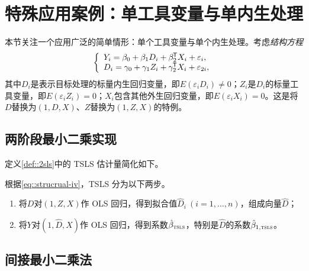 \section{特殊应用案例：单工具变量与单内生处理}


本节关注一个应用广泛的简单情形：单个工具变量与单个内生处理。考虑{\it 结构方程}
\begin{eqnarray}
\label{eq::strucrual-iv}
\left\{
\begin{array}{l}
Y_i = \beta_0 + \beta_1 D_i + \beta_2^{\mkern-1.5mu\mathsf{T}} X_i + \varepsilon_{i},\\
D_i = \gamma_0 + \gamma_1 Z_i + \gamma_2 ^{\mkern-1.5mu\mathsf{T}} X_i + \varepsilon_{2i},
\end{array}
\right.
\end{eqnarray}
其中$D_i$是表示目标处理的标量内生回归变量，即$E(\varepsilon_{i} D_i) \neq 0$；$Z_i$是$D_i$的标量工具变量，即$E(\varepsilon_{i} Z_i) = 0$；$X_i$包含其他外生回归变量，即$E(\varepsilon_{i} X_i) = 0$。这是将$D$替换为$(1, D, X)$、$Z$替换为$(1, Z, X)$的特例。 



\subsection{两阶段最小二乘实现}

定义\ref{def::2sls}中的 TSLS 估计量简化如下。 

\begin{definition}
\label{def::tsls-single}
根据\eqref{eq::strucrual-iv}，TSLS 分为以下两步。
\begin{enumerate}
\item
将$D$对$(1, Z,X)$作 OLS 回归，得到拟合值$\hat{D}_i\ (i=1,\ldots, n)$，组成向量$\hat{D}$； 

\item 
将$Y$对$(1, \hat{D}, X)$作 OLS 回归，得到系数$\hat{\beta}_\textsc{tsls}$，特别是$\hat{D}$的系数$\hat{\beta}_{1,\textsc{tsls}}$。 
\end{enumerate}
\end{definition}



\subsection{间接最小二乘法}


